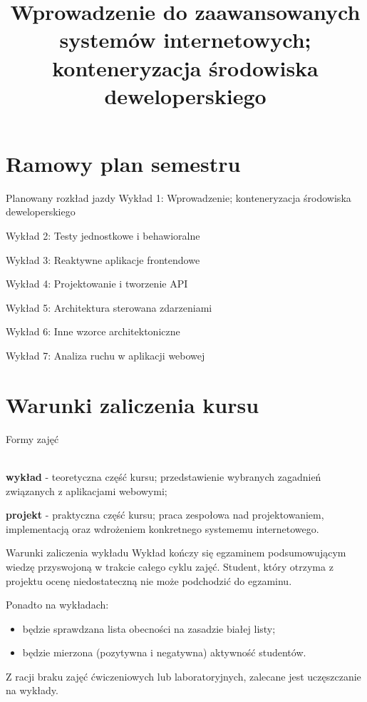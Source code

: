 

\title{Wprowadzenie do zaawansowanych systemów internetowych; konteneryzacja środowiska deweloperskiego}



\section{Ramowy plan semestru}

\begin{frame}{Planowany rozkład jazdy}
	Wykład 1: Wprowadzenie; konteneryzacja środowiska deweloperskiego
	
	Wykład 2: Testy jednostkowe i behawioralne
	
	Wykład 3: Reaktywne aplikacje frontendowe
	
	Wykład 4: Projektowanie i tworzenie API
	
	Wykład 5: Architektura sterowana zdarzeniami
	
	Wykład 6: Inne wzorce architektoniczne
	
	Wykład 7: Analiza ruchu w aplikacji webowej
\end{frame}

\section{Warunki zaliczenia kursu}

\begin{frame}{Formy zajęć}
	\begin{figure}
	\end{figure}
	
	\ \\
	
	\textbf{wykład} - teoretyczna część kursu; przedstawienie wybranych zagadnień związanych z aplikacjami webowymi;
	
	\textbf{projekt} - praktyczna część kursu; praca zespołowa nad projektowaniem, implementacją oraz wdrożeniem konkretnego systememu internetowego.
\end{frame}

\begin{frame}{Warunki zaliczenia wykładu}
	Wykład kończy się egzaminem podsumowującym wiedzę przyswojoną w trakcie całego cyklu zajęć. Student, który otrzyma z projektu ocenę niedostateczną nie może podchodzić do egzaminu.
	
	Ponadto na wykładach:
	\begin{itemize}
		\item będzie sprawdzana lista obecności na zasadzie białej listy;
		\item będzie mierzona (pozytywna i negatywna) aktywność studentów.
	\end{itemize}
	
	Z racji braku zajęć ćwiczeniowych lub laboratoryjnych, zalecane jest uczęszczanie na wykłady.
\end{frame}

